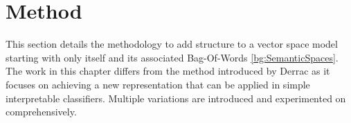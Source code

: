 







\section{Method}\label{ch3:method}

This section details the methodology to add structure to a vector space model starting with only itself and its associated Bag-Of-Words \ref{bg:SemanticSpaces}.  The work in this chapter differs from the method introduced by Derrac \cite{Derrac2015} as it focuses on achieving a new representation that can be applied in simple interpretable classifiers. Multiple variations are introduced and experimented on comprehensively.%


